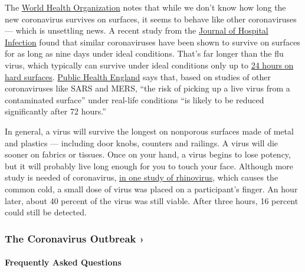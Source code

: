 The
\href{https://www.who.int/news-room/q-a-detail/q-a-coronaviruses}{World
Health Organization} notes that while we don't know how long the new
coronavirus survives on surfaces, it seems to behave like other
coronaviruses --- which is unsettling news. A recent study from the
\href{https://www.journalofhospitalinfection.com/article/S0195-6701(20)30046-3/fulltext}{Journal
of Hospital Infection} found that similar coronaviruses have been shown
to survive on surfaces for as long as nine days under ideal conditions.
That's far longer than the flu virus, which typically can survive under
ideal conditions only up to
\href{https://www.nhs.uk/common-health-questions/infections/how-long-do-bacteria-and-viruses-live-outside-the-body/}{24
hours on hard surfaces}.
\href{https://www.gov.uk/government/publications/covid-19-decontamination-in-non-healthcare-settings/covid-19-decontamination-in-non-healthcare-settings}{Public
Health England} says that, based on studies of other coronaviruses like
SARS and MERS, ``the risk of picking up a live virus from a contaminated
surface'' under real-life conditions ``is likely to be reduced
significantly after 72 hours.''

In general, a virus will survive the longest on nonporous surfaces made
of metal and plastics --- including door knobs, counters and railings. A
virus will die sooner on fabrics or tissues. Once on your hand, a virus
begins to lose potency, but it will probably live long enough for you to
touch your face. Although more study is needed of coronavirus,
\href{https://www.ncbi.nlm.nih.gov/pubmed/1658033}{in one study of
rhinovirus,} which causes the common cold, a small dose of virus was
placed on a participant's finger. An hour later, about 40 percent of the
virus was still viable. After three hours, 16 percent could still be
detected.

\href{https://www.nytimes3xbfgragh.onion/news-event/coronavirus?action=click\&pgtype=Article\&state=default\&region=MAIN_CONTENT_3\&context=storylines_faq}{}

\hypertarget{the-coronavirus-outbreak-}{%
\subsubsection{The Coronavirus Outbreak
›}\label{the-coronavirus-outbreak-}}

\hypertarget{frequently-asked-questions}{%
\paragraph{Frequently Asked
Questions}\label{frequently-asked-questions}}


